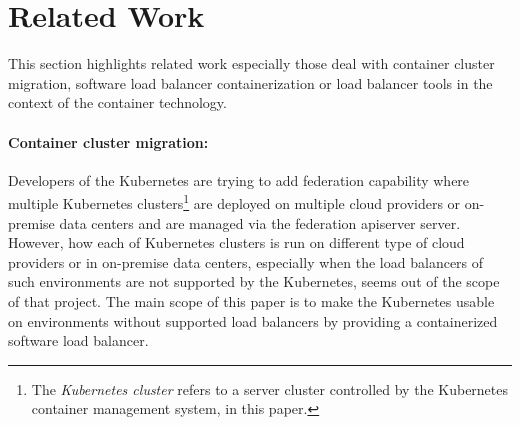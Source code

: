 \section{Related Work}\label{Related Work}

This section highlights related work especially those deal with container cluster migration, 
software load balancer containerization or load balancer tools in the context of the container technology.

\paragraph{\bf Container cluster migration:}

Developers of the Kubernetes are trying to add federation\cite{K8sFederation2017} capability 
where multiple Kubernetes clusters\footnote{The {\em Kubernetes cluster} refers to a server cluster 
controlled by the Kubernetes container management system, in this paper.} 
are deployed on multiple cloud providers or on-premise data centers 
and are managed via the federation apiserver server. However, how each of Kubernetes clusters is run on different type of cloud providers
or in on-premise data centers, especially when the load balancers of such environments are not supported by the Kubernetes, 
seems out of the scope of that project. 
The main scope of this paper is to make the Kubernetes usable on environments 
without supported load balancers by providing a containerized software load balancer.

